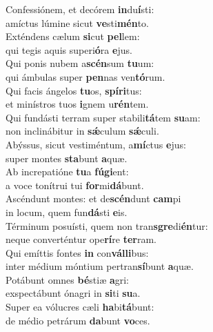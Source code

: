 \evenverse Confessiónem, et decórem \textbf{in}du\textbf{í}sti:~\*\\
\evenverse amíctus lúmine sicut \textbf{ve}sti\textbf{mén}to.\\
\oddverse Exténdens cælum \textbf{si}cut \textbf{pel}lem:~\*\\
\oddverse qui tegis aquis superi\textbf{ó}ra \textbf{e}jus.\\
\evenverse Qui ponis nubem a\textbf{scén}sum \textbf{tu}um:~\*\\
\evenverse qui ámbulas super \textbf{pen}nas ven\textbf{tó}rum.\\
\oddverse Qui facis ángelos \textbf{tu}os, \textbf{spí}\textbf{ri}tus:~\*\\
\oddverse et minístros tuos \textbf{i}gnem u\textbf{rén}tem.\\
\evenverse Qui fundásti terram super stabili\textbf{tá}tem \textbf{su}am:~\*\\
\evenverse non inclinábitur in \textbf{sǽ}culum \textbf{sǽ}culi.\\
\oddverse Abýssus, sicut vestiméntum, a\textbf{mí}ctus \textbf{e}jus:~\*\\
\oddverse super montes \textbf{sta}bunt \textbf{a}quæ.\\
\evenverse Ab increpatióne \textbf{tu}a \textbf{fú}\textbf{gi}ent:~\*\\
\evenverse a voce tonítrui tui \textbf{for}mi\textbf{dá}bunt.\\
\oddverse Ascéndunt montes: et de\textbf{scén}dunt \textbf{cam}pi~\*\\
\oddverse in locum, quem fun\textbf{dá}sti \textbf{e}is.\\
\evenverse Términum posuísti, quem non tran\textbf{sgre}di\textbf{én}tur:~\*\\
\evenverse neque converténtur ope\textbf{rí}re \textbf{ter}ram.\\
\oddverse Qui emíttis fontes \textbf{in} con\textbf{vál}\textbf{li}bus:~\*\\
\oddverse inter médium móntium pertran\textbf{sí}bunt \textbf{a}quæ.\\
\evenverse Potábunt omnes \textbf{bé}stiæ \textbf{a}gri:~\*\\
\evenverse exspectábunt ónagri in \textbf{si}ti \textbf{su}a.\\
\oddverse Super ea vólucres cæli \textbf{ha}bi\textbf{tá}bunt:~\*\\
\oddverse de médio petrárum \textbf{da}bunt \textbf{vo}ces.\\
